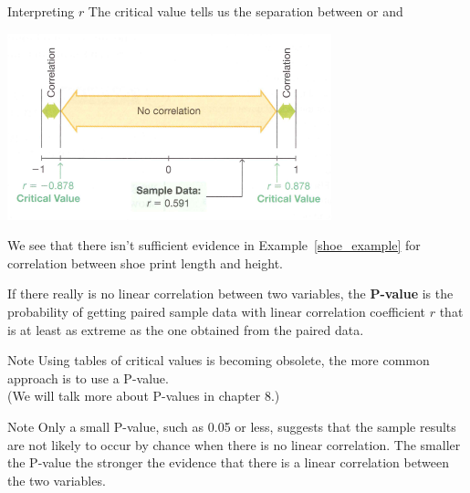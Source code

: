 \documentclass{beamer}
\begin{document}
\begin{frame}
\begin{block}{Interpreting $r$}
The critical value tells us the separation between  or  and 
\begin{center}
\includegraphics{corrfig.png}
\end{center}\pause
We see that there isn't sufficient evidence in Example~\ref{shoe_example} for correlation between shoe print length and height.
\end{block}
\end{frame}

\begin{frame}
\begin{definition}
If there really is no linear correlation between two variables, the \textbf{P-value} is the probability of getting paired sample data with linear correlation coefficient $r$ that is at least as extreme as the one obtained from the paired data.
\end{definition}\pause

\begin{block}{Note}
Using tables of critical values is becoming obsolete, the more common approach is to use a P-value.\\ (We will talk more about P-values in chapter 8.)
\end{block}\pause

\begin{block}{Note}
Only a small P-value, such as 0.05 or less, suggests that the sample results are not likely to occur by chance when there is no linear correlation. The smaller the P-value the stronger the evidence that there is a linear correlation between the two variables.
\end{block}
\end{frame}
\end{document}
